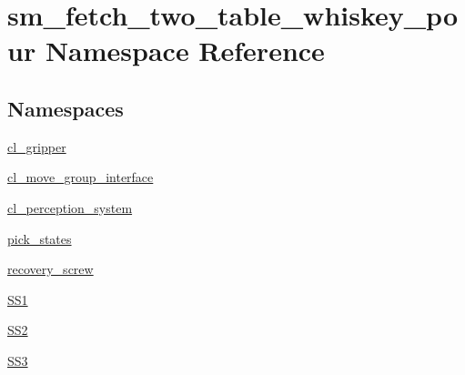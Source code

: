 \hypertarget{namespacesm__fetch__two__table__whiskey__pour}{}\section{sm\+\_\+fetch\+\_\+two\+\_\+table\+\_\+whiskey\+\_\+pour Namespace Reference}
\label{namespacesm__fetch__two__table__whiskey__pour}
\subsection*{Namespaces}
\begin{DoxyCompactItemize}
\item 
 \hyperlink{namespacesm__fetch__two__table__whiskey__pour_1_1cl__gripper}{cl\+\_\+gripper}
\item 
 \hyperlink{namespacesm__fetch__two__table__whiskey__pour_1_1cl__move__group__interface}{cl\+\_\+move\+\_\+group\+\_\+interface}
\item 
 \hyperlink{namespacesm__fetch__two__table__whiskey__pour_1_1cl__perception__system}{cl\+\_\+perception\+\_\+system}
\item 
 \hyperlink{namespacesm__fetch__two__table__whiskey__pour_1_1pick__states}{pick\+\_\+states}
\item 
 \hyperlink{namespacesm__fetch__two__table__whiskey__pour_1_1recovery__screw}{recovery\+\_\+screw}
\item 
 \hyperlink{namespacesm__fetch__two__table__whiskey__pour_1_1SS1}{S\+S1}
\item 
 \hyperlink{namespacesm__fetch__two__table__whiskey__pour_1_1SS2}{S\+S2}
\item 
 \hyperlink{namespacesm__fetch__two__table__whiskey__pour_1_1SS3}{S\+S3}
\end{DoxyCompactItemize}

